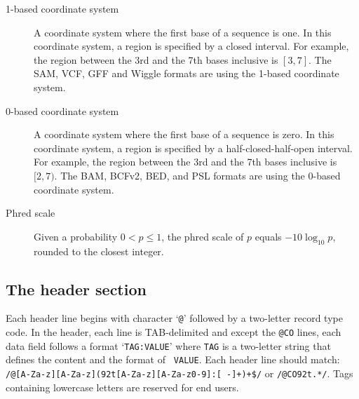 \documentclass[10pt]{article}
\begin{document}
\begin{description}
\item[1-based coordinate system] A coordinate system where the first
  base of a sequence is one. In this coordinate system, a region is
  specified by a closed interval. For example, the region between the
  3rd and the 7th bases inclusive is $[3,7]$. The SAM, VCF, GFF and Wiggle
  formats are using the 1-based coordinate system.

\item[0-based coordinate system] A coordinate system where the first
  base of a sequence is zero. In this coordinate system, a region is
  specified by a half-closed-half-open interval. For example, the region
  between the 3rd and the 7th bases inclusive is $[2,7)$. The BAM, BCFv2, BED,
  and PSL formats are using the 0-based coordinate system.

\item[Phred scale] Given a probability $0<p\le 1$, the phred scale of $p$
  equals $-10\log_{10}p$, rounded to the closest integer.

\end{description}


\subsection{The header section}
Each header line begins with character `{\tt @}' followed by a
two-letter record type code. In the header, each line is TAB-delimited
and except the {\tt @CO} lines, each data field follows a format `{\tt TAG:VALUE}' where {\tt TAG}
is a two-letter string that defines the content and the format of {\tt
  VALUE}. Each header line should match: {\tt
  /@[A-Za-z][A-Za-z](\char92t[A-Za-z][A-Za-z0-9]:[
  -]+)+\$/} or {\tt /@CO\char92t.*/}. Tags containing lowercase letters are reserved for
end users.
\end{document}
